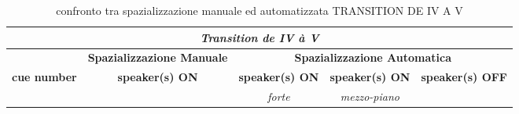 \begin{table*}[h]

\caption{confronto tra spazializzazione manuale ed automatizzata TRANSITION DE IV A V}
\begin{center}
\begin{tabular}{c c c c c}

\hline
\multicolumn{5}{c}{\emph{\textbf{Transition de IV à V}}} \\
\hline

	&
\multicolumn{1}{c}{\textbf{Spazializzazione Manuale}} &
\multicolumn{3}{c}{\textbf{Spazializzazione Automatica}} \\

\hline

\textbf{cue number}		&
\textbf{speaker(s) ON }	&
\textbf{speaker(s) ON}	&
\textbf{speaker(s) ON}	&
\textbf{speaker(s) OFF}	\\

&
&
\emph{forte} &
\emph{mezzo-piano} &
\\


\end{tabular}
\end{center}
\end{table*}
